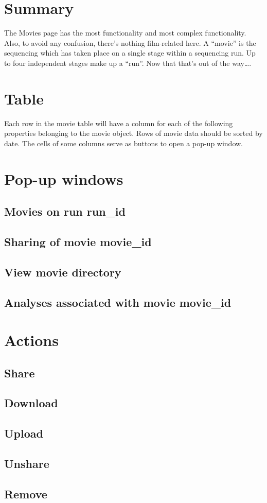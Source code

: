
\section{Summary}
The Movies page has the most functionality and most complex functionality. Also, to avoid any confusion, there’s nothing film-related here. A “movie” is the sequencing which has taken place on a single stage within a sequencing run. Up to four independent stages make up a “run”. Now that that’s out of the way….

\section{Table}
Each row in the movie table will have a column for each of the following properties belonging to the movie object. Rows of movie data should be sorted by date. The cells of some columns serve as buttons to open a pop-up window.

\section{Pop-up windows}
\subsection{Movies on run run\_id}
\subsection{Sharing of movie movie\_id}
\subsection{View movie directory}
\subsection{Analyses associated with movie movie\_id}
\section{Actions}
\subsection{Share}
\subsection{Download}
\subsection{Upload}
\subsection{Unshare}
\subsection{Remove}

